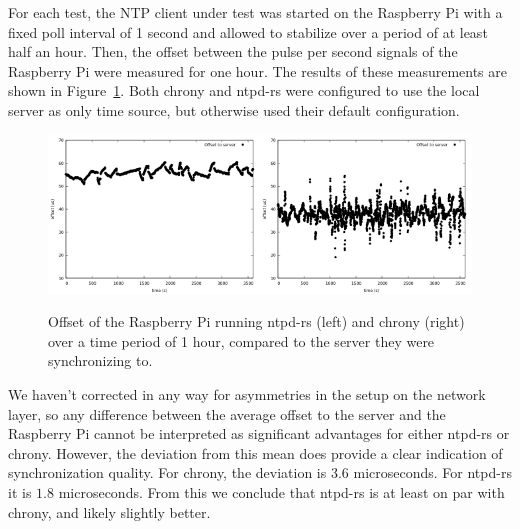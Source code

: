 \documentclass{article}
\begin{document}
For each test, the NTP client under test was started on the Raspberry Pi with a fixed poll interval of 1 second and allowed to stabilize over a period of at least half an hour. Then, the offset between the pulse per second signals of the Raspberry Pi were measured for one hour. The results of these measurements are shown in Figure~\ref{fig:offset-time}. Both chrony and ntpd-rs were configured to use the local server as only time source, but otherwise used their default configuration.

\begin{figure}[h]
\includegraphics[width=0.5\textwidth]{offset-ntpd-rs.png}\includegraphics[width=0.5\textwidth]{offset-chrony.png}
\caption{Offset of the Raspberry Pi running ntpd-rs (left) and chrony (right) over a time period of 1 hour, compared to the server they were synchronizing to.}\label{fig:offset-time}
\end{figure}

We haven't corrected in any way for asymmetries in the setup on the network layer, so any difference between the average offset to the server and the Raspberry Pi cannot be interpreted as significant advantages for either ntpd-rs or chrony. However, the deviation from this mean does provide a clear indication of synchronization quality. For chrony, the deviation is $3.6$ microseconds. For ntpd-rs it is $1.8$ microseconds. From this we conclude that ntpd-rs is at least on par with chrony, and likely slightly better.



\end{document}
